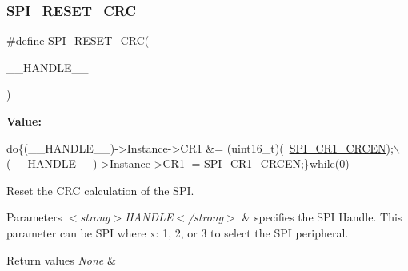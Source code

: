 \subsubsection{\texorpdfstring{S\+P\+I\+\_\+\+R\+E\+S\+E\+T\+\_\+\+C\+RC}{SPI\_RESET\_CRC}}
{\footnotesize\ttfamily \#define S\+P\+I\+\_\+\+R\+E\+S\+E\+T\+\_\+\+C\+RC(\begin{DoxyParamCaption}\item[{}]{\+\_\+\+\_\+\+H\+A\+N\+D\+L\+E\+\_\+\+\_\+ }\end{DoxyParamCaption})}

{\bfseries Value\+:}
\begin{DoxyCode}
\textcolor{keywordflow}{do}\{(\_\_HANDLE\_\_)->Instance->CR1 &= (uint16\_t)(~\hyperlink{group___peripheral___registers___bits___definition_gac9339b7c6466f09ad26c26b3bb81c51b}{SPI\_CR1\_CRCEN});\(\backslash\)
                                     (\_\_HANDLE\_\_)->Instance->CR1 |= 
      \hyperlink{group___peripheral___registers___bits___definition_gac9339b7c6466f09ad26c26b3bb81c51b}{SPI\_CR1\_CRCEN};\}\textcolor{keywordflow}{while}(0)
\end{DoxyCode}


Reset the C\+RC calculation of the S\+PI. 


\begin{DoxyParams}{Parameters}
{\em $<$strong$>$\+H\+A\+N\+D\+L\+E$<$/strong$>$} & specifies the S\+PI Handle. This parameter can be S\+PI where x\+: 1, 2, or 3 to select the S\+PI peripheral. \\
\hline
\end{DoxyParams}

\begin{DoxyRetVals}{Return values}
{\em None} & \\
\hline
\end{DoxyRetVals}
